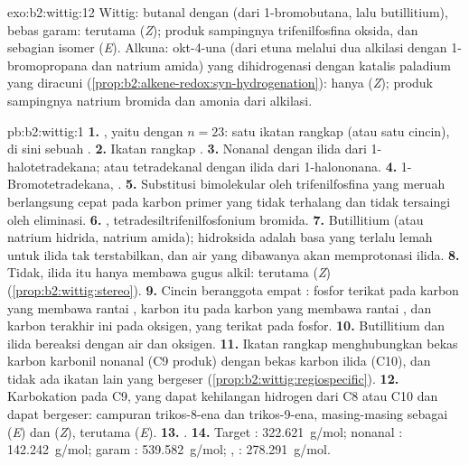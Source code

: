 \begin{solution}{exo:b2:wittig:12}
Wittig: butanal dengan  (dari 1-bromobutana, lalu
butillitium), bebas garam: terutama (\textit{Z}); produk sampingnya
trifenilfosfina oksida, dan sebagian isomer (\textit{E}). Alkuna: okt-4-una
(dari etuna melalui dua alkilasi dengan 1-bromopropana dan natrium amida)
yang dihidrogenasi dengan katalis paladium yang diracuni
(\cref{prop:b2:alkene-redox:syn-hydrogenation}): hanya (\textit{Z}); produk
sampingnya natrium bromida dan amonia dari alkilasi.
\end{solution}

\begin{solution}{pb:b2:wittig:1}
\textbf{1.} , yaitu  dengan $n = 23$: satu ikatan
rangkap (atau satu cincin), di sini sebuah
.
\textbf{2.} Ikatan rangkap .
\textbf{3.} Nonanal  dengan ilida dari 1-halotetradekana;
atau tetradekanal  dengan ilida dari 1-halononana.
\textbf{4.} 1-Bromotetradekana, .
\textbf{5.} Substitusi bimolekular oleh trifenilfosfina yang meruah
berlangsung cepat pada karbon primer yang tidak terhalang dan tidak
tersaingi oleh eliminasi.
\textbf{6.} , tetradesiltrifenilfosfonium bromida.
\textbf{7.} Butillitium (atau natrium hidrida, natrium amida); hidroksida
adalah basa yang terlalu lemah untuk ilida tak terstabilkan, dan air yang
dibawanya akan memprotonasi ilida.
\textbf{8.} Tidak, ilida itu hanya membawa gugus alkil: terutama (\textit{Z})
(\cref{prop:b2:wittig:stereo}).
\textbf{9.} Cincin beranggota empat : fosfor terikat pada karbon
yang membawa rantai , karbon itu pada karbon yang membawa rantai
, dan karbon terakhir ini pada oksigen, yang terikat pada fosfor.
\textbf{10.} Butillitium dan ilida bereaksi dengan air dan oksigen.
\textbf{11.} Ikatan rangkap menghubungkan bekas karbon karbonil nonanal (C9
produk) dengan bekas karbon ilida (C10), dan tidak ada ikatan lain yang
bergeser (\cref{prop:b2:wittig:regiospecific}).
\textbf{12.} Karbokation pada C9, yang dapat kehilangan hidrogen dari C8 atau
C10 dan dapat bergeser: campuran trikos-8-ena dan trikos-9-ena, masing-masing
sebagai (\textit{E}) dan (\textit{Z}), terutama (\textit{E}).
\textbf{13.} .
\textbf{14.} Target : \qty{322.621}{g/mol}; nonanal : \qty{142.242}{g/mol}; garam
: \qty{539.582}{g/mol}; , : \qty{278.291}{g/mol}.

\end{solution}
